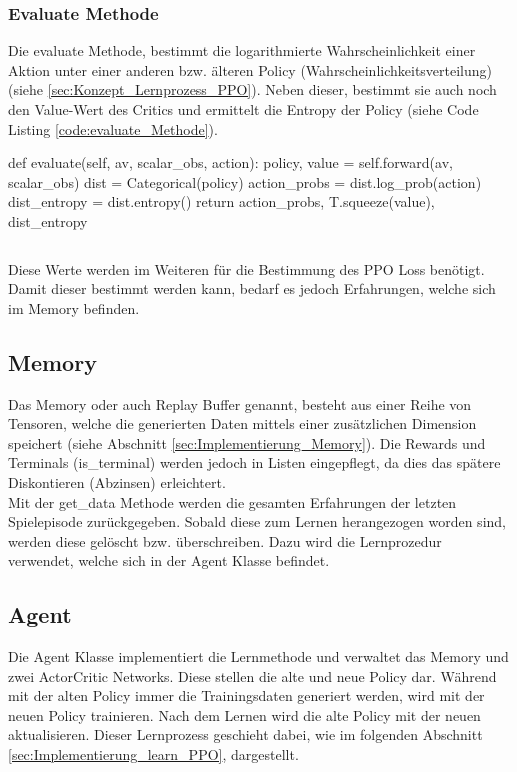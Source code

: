 \subsubsection{Evaluate Methode} \label{sec:Implementierung_Evaluate}
Die evaluate Methode, bestimmt die logarithmierte Wahrscheinlichkeit einer Aktion unter einer anderen bzw. älteren Policy (Wahrscheinlichkeitsverteilung) (siehe \ref{sec:Konzept_Lernprozess_PPO}). 
Neben dieser, bestimmt sie auch noch den Value-Wert des Critics und ermittelt die Entropy der Policy (siehe Code Listing \ref{code:evaluate_Methode}).
\begin{python}
def evaluate(self, av, scalar_obs, action):
	policy, value = self.forward(av, scalar_obs)
	dist = Categorical(policy)
	action_probs = dist.log_prob(action)
	dist_entropy = dist.entropy()
	return action_probs, T.squeeze(value), dist_entropy
\end{python}
\begin{lstlisting}[caption=Darstellung der evaluate Methode, label=code:evaluate_Methode]
\end{lstlisting}
Diese Werte werden im Weiteren für die Bestimmung des PPO Loss benötigt. Damit dieser bestimmt werden kann, bedarf es jedoch Erfahrungen, welche sich im Memory befinden.

\subsection{Memory}
Das Memory oder auch Replay Buffer genannt, besteht aus einer Reihe von Tensoren, welche die generierten Daten mittels einer zusätzlichen Dimension speichert (siehe Abschnitt \ref{sec:Implementierung_Memory}). Die Rewards und Terminals (is\_terminal) werden jedoch in Listen eingepflegt, da dies das spätere Diskontieren (Abzinsen) erleichtert.\\
Mit der get\_data Methode werden die gesamten Erfahrungen der letzten Spielepisode zurückgegeben. 
Sobald diese zum Lernen herangezogen worden sind, werden diese gelöscht bzw. überschreiben. Dazu wird die Lernprozedur verwendet, welche sich in der Agent Klasse befindet. 

\subsection{Agent} \label{sec:Implementierung_PPO_Agent}
Die Agent Klasse implementiert die Lernmethode und verwaltet das Memory und zwei ActorCritic Networks. Diese stellen die alte und neue Policy dar. Während mit der alten Policy immer die Trainingsdaten generiert werden, wird mit der neuen Policy trainieren. Nach dem Lernen wird die alte Policy mit der neuen aktualisieren. Dieser Lernprozess geschieht dabei, wie im folgenden Abschnitt \ref{sec:Implementierung_learn_PPO}, dargestellt.

